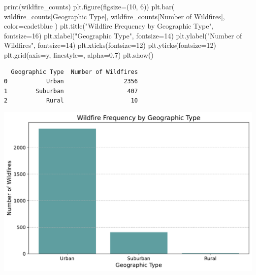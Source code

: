 \documentclass[
  letterpaper,
  DIV=11,
  numbers=noendperiod]{scrartcl}
\newenvironment{Shaded}{\begin{snugshade}}{\end{snugshade}}
\newcommand{\BuiltInTok}[1]{\textcolor[rgb]{0.00,0.23,0.31}{#1}}
\newcommand{\DecValTok}[1]{\textcolor[rgb]{0.68,0.00,0.00}{#1}}
\newcommand{\FloatTok}[1]{\textcolor[rgb]{0.68,0.00,0.00}{#1}}
\newcommand{\NormalTok}[1]{\textcolor[rgb]{0.00,0.23,0.31}{#1}}
\newcommand{\OperatorTok}[1]{\textcolor[rgb]{0.37,0.37,0.37}{#1}}
\newcommand{\StringTok}[1]{\textcolor[rgb]{0.13,0.47,0.30}{#1}}
\begin{document}
\begin{Shaded}
\begin{Highlighting}[]
\BuiltInTok{print}\NormalTok{(wildfire\_counts)}
\NormalTok{plt.figure(figsize}\OperatorTok{=}\NormalTok{(}\DecValTok{10}\NormalTok{, }\DecValTok{6}\NormalTok{))}
\NormalTok{plt.bar(}
\NormalTok{    wildfire\_counts[}\StringTok{\textquotesingle{}Geographic Type\textquotesingle{}}\NormalTok{],}
\NormalTok{    wildfire\_counts[}\StringTok{\textquotesingle{}Number of Wildfires\textquotesingle{}}\NormalTok{],}
\NormalTok{    color}\OperatorTok{=}\StringTok{\textquotesingle{}cadetblue\textquotesingle{}}
\NormalTok{)}
\NormalTok{plt.title(}\StringTok{"Wildfire Frequency by Geographic Type"}\NormalTok{, fontsize}\OperatorTok{=}\DecValTok{16}\NormalTok{)}
\NormalTok{plt.xlabel(}\StringTok{"Geographic Type"}\NormalTok{, fontsize}\OperatorTok{=}\DecValTok{14}\NormalTok{)}
\NormalTok{plt.ylabel(}\StringTok{"Number of Wildfires"}\NormalTok{, fontsize}\OperatorTok{=}\DecValTok{14}\NormalTok{)}
\NormalTok{plt.xticks(fontsize}\OperatorTok{=}\DecValTok{12}\NormalTok{)}
\NormalTok{plt.yticks(fontsize}\OperatorTok{=}\DecValTok{12}\NormalTok{)}
\NormalTok{plt.grid(axis}\OperatorTok{=}\StringTok{\textquotesingle{}y\textquotesingle{}}\NormalTok{, linestyle}\OperatorTok{=}\StringTok{\textquotesingle{}{-}{-}\textquotesingle{}}\NormalTok{, alpha}\OperatorTok{=}\FloatTok{0.7}\NormalTok{)}
\NormalTok{plt.show()}
\end{Highlighting}
\end{Shaded}

\begin{verbatim}
  Geographic Type  Number of Wildfires
0           Urban                 2356
1        Suburban                  407
2           Rural                   10
\end{verbatim}

\includegraphics{Final Code_files/figure-pdf/cell-7-output-2.pdf}
\end{document}

